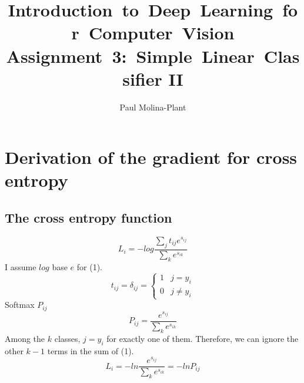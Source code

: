 \documentclass[12pt, letter]{article}
\newcommand{\courseName}{Introduction~to~Deep~Learning~for~Computer~Vision}
\newcommand{\assignName}{Assignment~3:~Simple~Linear~Classifier II}
\begin{document}
\pagestyle{titlesec_assignment}

\title{\courseName\\\assignName}
\author{Paul Molina-Plant}
\maketitle


\pagebreak

\section{Derivation of the gradient for cross entropy}
\subsection{The cross entropy function}
\begin{equation}
  L_i = - log \frac{\sum_jt_{ij}e^{s_{ij}}}{\sum_ke^{s_{ik}}}
\end{equation}
I assume $log$ base $e$ for (1).
\begin{equation}
  t_{ij} = \delta_{ij} =
  \begin{cases}
    1 & j = y_i \\
    0 & j \ne y_i
  \end{cases}
\end{equation}
Softmax $P_{ij}$
\begin{equation}
  P_{ij} = \frac{e^{s_{ij}}}{\sum_{k}e^{s_{ik}}}
\end{equation}
Among the $k$ classes, $j = y_{i}$ for exactly one of them. Therefore, we can
ignore the other $k-1$ terms in the sum of (1).
\begin{equation}
  L_i = - ln \frac{e^{s_{ij}}}{\sum_k{e^{s_{ik}}}} = -ln P_{ij}
\end{equation}
\end{document}
